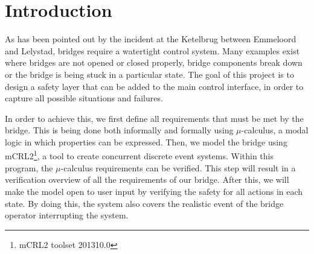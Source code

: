 \section{Introduction}

As has been pointed out by the incident at the Ketelbrug between Emmeloord and Lelystad, bridges require a watertight control system.  Many examples exist where bridges are not opened or closed properly, bridge components break down or the bridge is being stuck in a particular state. The goal of this project is to design a safety layer that can be added to the main control interface, in order to capture all possible situations and failures.

In order to achieve this, we first define all requirements that must be met by the bridge. This is being done both informally and formally using $\mu$-calculus, a modal logic in which properties can be expressed. Then, we model the bridge using mCRL2\footnote{mCRL2 toolset 201310.0}, a tool to create concurrent discrete event systems. Within this program, the $\mu$-calculus requirements can be verified. This step will result in a verification overview of all the requirements of our bridge. After this, we will make the model open to user input by verifying the safety for all actions in each state. By doing this, the system also covers the realistic event of the bridge operator interrupting the system.


